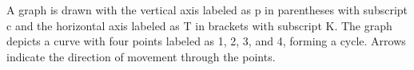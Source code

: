 A graph is drawn with the vertical axis labeled as p in parentheses with subscript c and the horizontal axis labeled as T in brackets with subscript K. The graph depicts a curve with four points labeled as 1, 2, 3, and 4, forming a cycle. Arrows indicate the direction of movement through the points.